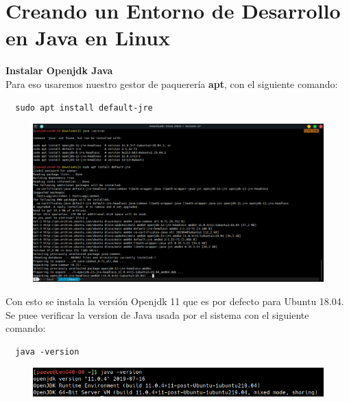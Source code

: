 \documentclass{article}
\begin{document}


\section{Creando un Entorno de Desarrollo en Java en Linux}%
\textbf{Instalar Openjdk Java}\\
Para eso usaremos nuestro gestor de paquerería \textbf{apt}, con el siguiente
comando:\\

\begin{verbatim}
  sudo apt install default-jre
\end{verbatim}

\begin{figure}[h!]
    \centering
      \includegraphics[scale=0.5]{./Pictures/002_openjdk_default.png}
\end{figure}

Con esto se instala la versión Openjdk 11 que es por defecto para Ubuntu 18.04.\\

Se puee verificar la version de Java usada por el sistema con el siguiente comando:
\begin{verbatim}
  java -version
\end{verbatim}

\begin{figure}[h!]
    \centering
      \includegraphics[scale=0.75]{./Pictures/004_javaversion1.png}
\end{figure}
\end{document}
